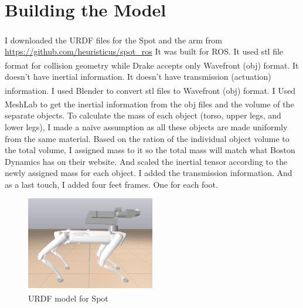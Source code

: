 \documentclass[conference]{IEEEtran}
\begin{document}
\section{Building the Model}
I downloaded the URDF files for the Spot\textsuperscript{\textregistered} and the arm from \url{https://github.com/heuristicus/spot_ros}
It was built for ROS.  It used stl file format for collision geometry while Drake\textsuperscript{\textregistered} accepts only Wavefront (obj) format.
It doesn't have inertial information. It doesn't have transmission (actuation) information.
I used Blender\textsuperscript{\textregistered} to convert stl files to Wavefront (obj) format.
I Used MeshLab\textsuperscript{\textregistered}  to get the inertial information from the obj files and the volume of the separate objects.
To calculate the mass of each object (torso, upper legs, and lower legs), I made a naive assumption as all these objects are made uniformly from the same material.
Based on the ration of the individual object volume to the total volume, I assigned mass to it so the total mass will match what Boston Dynamics has on their website.
And scaled the inertial tensor according to the newly assigned mass for each object. I added the transmission information. And as a last touch, I added four feet frames. One for each foot.
\begin{figure}
    \includegraphics[width=0.5\textwidth]{figures/SpotModel.png}
    \caption{URDF model for Spot\textsuperscript{\textregistered}}
    \label{fig:SpotModel}
\end{figure}
\end{document}
